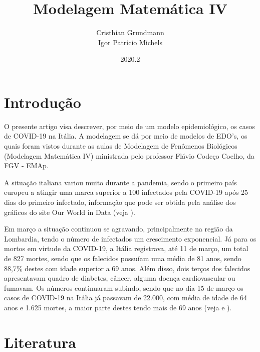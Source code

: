 \documentclass{article}
\title{Modelagem Matemática IV}
\author{Cristhian Grundmann \\
Igor Patrício Michels}
\date{2020.2}
\begin{document}
\maketitle

\section{Introdução}

O presente artigo visa descrever, por meio de um modelo epidemiológico, os casos de COVID-19 na Itália. A modelagem se dá por meio de modelos de EDO's, os quais foram vistos durante as aulas de Modelagem de Fenômenos Biológicos (Modelagem Matemática IV) ministrada pelo professor Flávio Codeço Coelho, da FGV - EMAp.

A situação italiana variou muito durante a pandemia, sendo o primeiro país europeu a atingir uma marca superior a 100 infectados pela COVID-19 após 25 dias do primeiro infectado, informação que pode ser obtida pela análise dos gráficos do site Our World in Data (veja \cite{owid}).

Em março a situação continuou se agravando, principalmente na região da Lombardia, tendo o número de infectados um crescimento exponencial. Já para os mortos em virtude da COVID-19, a Itália registrava, até 11 de março, um total de 827 mortes, sendo que os falecidos possuíam uma média de 81 anos, sendo 88,7\% destes com idade superior a 69 anos. Além disso, dois terços dos falecidos apresentavam quadro de diabetes, câncer, alguma doença cardiovascular ou fumavam. Os números continuaram subindo, sendo que no dia 15 de março os casos de COVID-19 na Itália já passavam de 22.000, com média de idade de 64 anos e 1.625 mortes, a maior parte destes tendo mais de 69 anos (veja \cite{REMUZZI20201225} e \cite{10.1001/jama.2020.4344}).


\section{Literatura}
\end{document}

